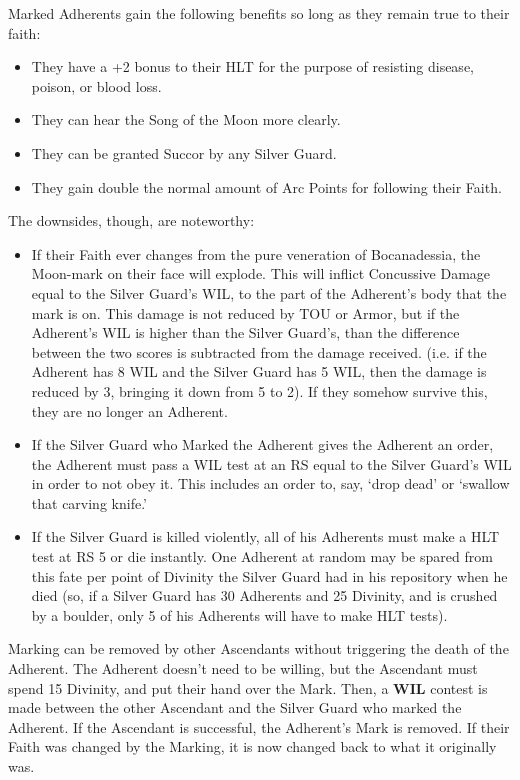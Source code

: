 \documentclass[oneside,11pt,english]{book}
\begin{document}
Marked Adherents gain the following benefits so long as they remain true to their faith: 
\begin{itemize}
\item They have a +2 bonus to their HLT for the purpose of resisting disease, poison, or blood 
  loss. 
\item They can hear the Song of the Moon more clearly. 
\item They can be granted Succor by any Silver Guard. 
\item They gain double the normal amount of Arc Points for following their Faith. 
\end{itemize}
The downsides, though, are noteworthy: 
\begin{itemize}
\item If their Faith ever changes from the pure veneration of Bocanadessia, the Moon-mark on 
  their face will explode. This will inflict Concussive Damage equal to the Silver Guard's 
  WIL, to the part of the Adherent's body that the mark is on. This damage is not reduced 
  by TOU or Armor, but if the Adherent's WIL is higher than the Silver Guard's, than the 
  difference between the two scores is subtracted from the damage received. (i.e. if the 
  Adherent has 8 WIL and the Silver Guard has 5 WIL, then the damage is reduced by 3, 
  bringing it down from 5 to 2). If they somehow survive this, they are no longer an 
  Adherent. 
\item If the Silver Guard who Marked the Adherent gives the Adherent an order, the Adherent 
  must pass a WIL test at an RS equal to the Silver Guard's WIL in order to not obey it. 
  This includes an order to, say, ‘drop dead’ or ‘swallow that carving knife.’ 
\item If the Silver Guard is killed violently, all of his Adherents must make a HLT test at RS 5 
  or die instantly. One Adherent at random may be spared from this fate per point of 
  Divinity the Silver Guard had in his repository when he died (so, if a Silver Guard has 30 
  Adherents and 25 Divinity, and is crushed by a boulder, only 5 of his Adherents will have 
  to make HLT tests). 
\end{itemize}
Marking can be removed by other Ascendants without triggering the death of the Adherent. The 
Adherent doesn't need to be willing, but the Ascendant must spend 15 Divinity, and put their 
hand over the Mark. Then, a \textbf{WIL} contest is made between the other Ascendant and the Silver 
Guard who marked the Adherent. If the Ascendant is successful, the Adherent's Mark is removed. 
If their Faith was changed by the Marking, it is now changed back to what it originally was. 
\end{document}
